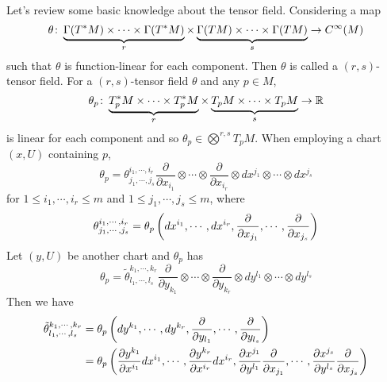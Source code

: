 \begin{enumerate}[label=\arabic{*}.]
	\begin{rmk}
		Let's review some basic knowledge about the tensor field. Considering a map
		\begin{equation*}
			\theta \colon \underbrace{\Gamma(T^*M)\times \cdots \times \Gamma(T^*M)}_{r} \times \underbrace{\Gamma(TM)\times \cdots \times \Gamma(TM)}_{s} \rightarrow C^\infty(M)
		\end{equation*}
		such that $\theta$ is function-linear for each component. Then $\theta$ is called a $(r,s)$-tensor field. For a $(r,s)$-tensor field $\theta$ and any $p \in M$,
		\begin{equation*}
			\theta_p \colon \underbrace{T_p^*M\times \cdots \times T_p^*M}_{r} \times \underbrace{T_pM\times \cdots \times T_pM}_{s} \rightarrow \mathbb{R}
		\end{equation*}
		is linear for each component and so $\theta_p\in \bigotimes^{r,s}T_pM$. When employing a chart $(x,U)$ containing $p$,
		\begin{equation*}
			\theta_p = \theta_{j_1,\cdots,j_s}^{i_1,\cdots,i_r}\frac{\partial}{\partial x_{i_1}}\otimes \cdots \otimes\frac{\partial}{\partial x_{i_r}}\otimes dx^{j_1}\otimes\cdots \otimes dx^{j_s}
		\end{equation*}
		for $1\leq i_1,\cdots,i_r \leq m$ and $1\leq j_1,\cdots,j_s \leq m$, where
		\begin{equation*}
			\theta_{j_1,\cdots,j_s}^{i_1,\cdots,i_r} = \theta_p\left(dx^{i_1},\cdots , dx^{i_r},\frac{\partial}{\partial x_{j_1}}, \cdots ,\frac{\partial}{\partial x_{j_s}}\right)
		\end{equation*}
		Let $(y,U)$ be another chart and $\theta_p$ has 
		\begin{equation*}
			\theta_p = \tilde{\theta}_{l_1,\cdots,l_s}^{k_1,\cdots,k_r}\frac{\partial}{\partial y_{k_1}}\otimes \cdots \otimes\frac{\partial}{\partial y_{k_r}}\otimes dy^{l_1}\otimes\cdots \otimes dy^{l_s}
		\end{equation*}
		Then we have
		\begin{equation*}
			\begin{aligned}
				\tilde{\theta}_{l_1,\cdots,l_s}^{k_1,\cdots,k_r} &= \theta_p\bc{dy^{k_1},\cdots , dy^{k_r},\frac{\partial}{\partial y_{l_1}}, \cdots ,\frac{\partial}{\partial y_{l_s}}} \\
				&= \theta_p\bc{\frac{\partial y^{k_1}}{\partial x^{i_1}}dx^{i_1},\cdots , \frac{\partial y^{k_r}}{\partial x^{i_r}}dx^{i_r},\frac{\partial x^{j_1}}{\partial y^{l_1}}\frac{\partial}{\partial x_{j_1}}, \cdots ,\frac{\partial x^{j_s}}{\partial y^{l_s}}\frac{\partial}{\partial x_{j_s}}} \\

\end{aligned}
\end{equation*}
\end{rmk}
\end{enumerate}

